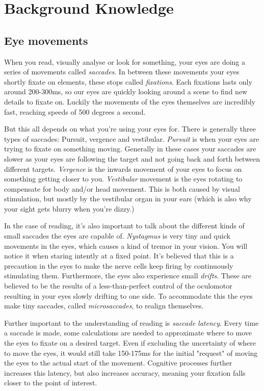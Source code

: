 \section{Background Knowledge}

\subsection{Eye movements}
When you read, visually analyse or look for something, your eyes are doing a series of movements called \textit{saccades}. In between these movements your eyes shortly fixate on elements, these stops called \textit{fixations}. Each fixations lasts only around 200-300ms, so our eyes are quickly looking around a scene to find new details to fixate on. Luckily the movements of the eyes themselves are incredibly fast, reaching speeds of 500 degrees a second.

But this all depends on what you're using your eyes for. There is generally three types of saccades:
Pursuit, vergence and vestibular.
\textit{Pursuit} is when your eyes are trying to fixate on something moving. Generally in these cases your saccades are slower as your eyes are following the target and not going back and forth between different targets.
\textit{Vergence} is the inwards movement of your eyes to focus on something getting closer to you.
\textit{Vestibular} movement is the eyes rotating to compensate for body and/or head movement. This is both caused by visual stimulation, but mostly by the vestibular organ in your ears (which is also why your sight gets blurry when you're dizzy.)

In the case of reading, it's also important to talk about the different kinds of small saccades the eyes are capable of. \textit{Nystagmus} is very tiny and quick movements in the eyes, which causes a kind of tremor in your vision. You will notice it when staring intently at a fixed point. It's believed that this is a precaution in the eyes to make the nerve cells keep firing by continuously stimulating them. Furthermore, the eyes also experience small \textit{drifts}. These are believed to be the results of a less-than-perfect control of the oculomotor resulting in your eyes slowly drifting to one side. To accommodate this the eyes make tiny saccades, called \textit{microsaccades}, to realign themselves.

Further important to the understanding of reading is \textit{saccade latency}. Every time a saccade is made, some calculations are needed to approximate where to move the eyes to fixate on a desired target. Even if excluding the uncertainty of where to move the eyes, it would still take 150-175ms for the initial "request" of moving the eyes to the actual start of the movement. Cognitive processes further increases this latency, but also increases accuracy, meaning your fixation falls closer to the point of interest.

